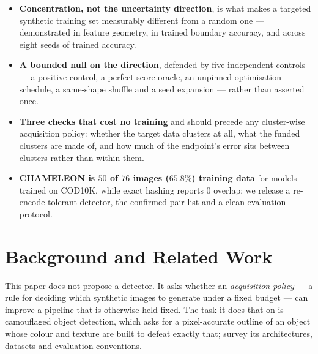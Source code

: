 \documentclass{article} %
\begin{document}
\begin{itemize}
\itemsep0.04em
\item \textbf{Concentration, not the uncertainty direction}, is what makes a targeted synthetic
training set measurably different from a random one --- demonstrated in feature geometry, in trained
boundary accuracy, and across eight seeds of trained accuracy.
\item \textbf{A bounded null on the direction}, defended by five independent controls --- a positive
control, a perfect-score oracle, an unpinned optimisation schedule, a same-shape shuffle and a seed
expansion --- rather than asserted once.
\item \textbf{Three checks that cost no training} and should precede any cluster-wise acquisition
policy: whether the target data clusters at all, what the funded clusters are made of, and how much
of the endpoint's error sits between clusters rather than within them.
\item \textbf{CHAMELEON is $50$ of $76$ images ($65.8\%$) training data} for models trained on
COD10K, while exact hashing reports $0$ overlap; we release a re-encode-tolerant detector, the
confirmed pair list and a clean evaluation protocol.
\end{itemize}

\section{Background and Related Work}
\label{sec:related}
This paper does not propose a detector. It asks whether an \emph{acquisition policy} --- a rule for
deciding which synthetic images to generate under a fixed budget --- can improve a pipeline that is
otherwise held fixed. The task it does that on is camouflaged object detection, which asks for a
pixel-accurate outline of an object whose colour and texture are built to defeat exactly that;
\citet{fan2023advances} survey its architectures, datasets and evaluation conventions.
\end{document}

